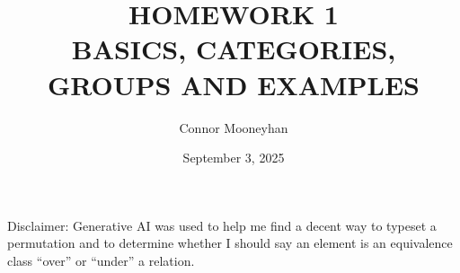 \documentclass[12pt]{article}
\title{HOMEWORK 1\\BASICS, CATEGORIES, GROUPS AND EXAMPLES}
\author{Connor Mooneyhan}
\date{September 3, 2025}
\theoremstyle{definition}
\newtheorem{ex}{}
\begin{document}
\maketitle

Disclaimer: Generative AI was used to help me find a decent way to typeset a permutation and to determine whether I should say an element is an equivalence class ``over'' or ``under'' a relation.

\end{document}
